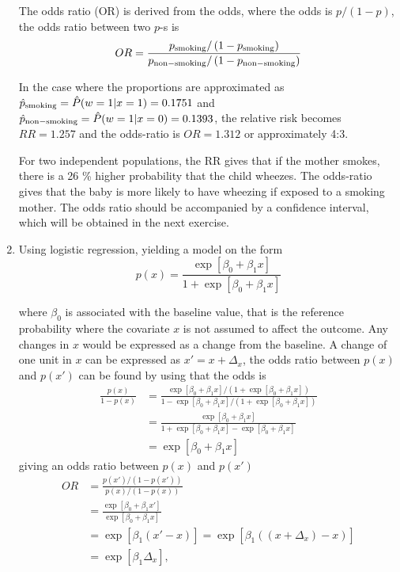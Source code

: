 \documentclass[a4paper,11pt]{article}
\begin{document}
\begin{enumerate}[label=\alph*)]
        The odds ratio (OR) is derived from the odds, where the odds is $p/(1-p)$, the odds ratio between two $p$-s is
        \begin{equation}
            OR = \frac{p_{\rm smoking} / \left( 1-p_{\rm smoking} \right)}{p_{\rm non-smoking} / \left( 1-p_{\rm non-smoking} \right)}
            \label{eq:OR}
        \end{equation}

        In the case where the proportions are approximated as $\hat{p}_{\rm smoking} = \hat{P}(w=1 | x=1 ) = 0.1751$ and $\hat{p}_{\rm non-smoking} = \hat{P}(w=1 | x=0) = 0.1393$, the relative risk becomes $RR = 1.257$ and the odds-ratio is $OR = 1.312$ or approximately 4:3. 

        For two independent populations, the RR gives that if the mother smokes, there is a 26 \% higher probability that the child wheezes. The odds-ratio gives that the baby is more likely to have wheezing if exposed to a smoking mother. The odds ratio should be accompanied by a confidence interval, which will be obtained in the next exercise. 

    \item Using logistic regression, yielding a model on the form
        \begin{equation}
            p(x) = \frac{\exp\left[ \beta_0 + \beta_1 x \right]}{1 + \exp\left[ \beta_0 + \beta_1 x \right]}
            \label{eq:logit}
        \end{equation}

        where $\beta_0$ is associated with the baseline value, that is the reference probability where the covariate $x$ is not assumed to affect the outcome. Any changes in $x$ would be expressed as a change from the baseline. A change of one unit in $x$ can be expressed as $x' = x + \Delta_x$, the odds ratio between $p(x)$ and $p(x')$ can be found by using that the odds is 
        \begin{align*}
            \frac{p(x)}{1 - p(x)} &= \frac{\exp\left[ \beta_0 + \beta_1 x \right] / \left( 1 + \exp\left[ \beta_0 + \beta_1 x \right] \right)}{1 - \exp\left[ \beta_0 + \beta_1 x \right]/\left( 1 + \exp\left[ \beta_0 + \beta_1 x \right] \right)} \\
            &= \frac{\exp\left[ \beta_0 + \beta_1 x \right]}{1 + \exp\left[ \beta_0 + \beta_1 x \right] - \exp\left[ \beta_0 + \beta_1 x \right]} \\
            &= \exp\left[ \beta_0 + \beta_1 x \right]
        \end{align*}
        giving an odds ratio between $p(x)$ and $p(x')$
        \begin{align*}
            OR &= \frac{p(x')/\left( 1 - p(x') \right)}{p(x)/\left( 1-p(x) \right)} \\
            &= \frac{\exp\left[ \beta_0 + \beta_1 x' \right]}{\exp\left[ \beta_0 + \beta_1 x \right]} \\
            &= \exp\left[ \beta_1 \left( x' - x \right) \right] = \exp\left[ \beta_1 \left( (x + \Delta_x) - x \right) \right] \\
            &= \exp\left[ \beta_1 \Delta_x \right],
        \end{align*}


\end{enumerate}
\end{document}
